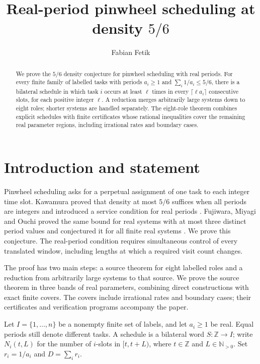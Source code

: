 \documentclass[11pt,a4paper]{article}
\title{Real-period pinwheel scheduling at density $5/6$}
\author{Fabian Fetik}
\date{}
\begin{document}
\maketitle
\begin{abstract}

We prove the \(5/6\) density conjecture for pinwheel scheduling with real periods. For every finite family of labelled tasks with periods \(a_i\ge1\) and \(\sum_i1/a_i\le5/6\), there is a bilateral schedule in which task \(i\) occurs at least \(\ell\) times in every \(\lceil\ell a_i\rceil\) consecutive slots, for each positive integer \(\ell\). A reduction merges arbitrarily large systems down to eight roles; shorter systems are handled separately. The eight-role theorem combines explicit schedules with finite certificates whose rational inequalities cover the remaining real parameter regions, including irrational rates and boundary cases.

\end{abstract}

\section{Introduction and statement}\label{sec:1}

Pinwheel scheduling asks for a perpetual assignment of one task to each integer time slot. Kawamura proved that density at most \(5/6\) suffices when all periods are integers and introduced a service condition for real periods \cite{kawamura}. Fujiwara, Miyagi and Ouchi proved the same bound for real systems with at most three distinct period values and conjectured it for all finite real systems \cite{fujiwara-miyagi-ouchi}. We prove this conjecture. The real-period condition requires simultaneous control of every translated window, including lengths at which a required visit count changes.

The proof has two main steps: a source theorem for eight labelled roles and a reduction from arbitrarily large systems to that source. We prove the source theorem in three bands of real parameters, combining direct constructions with exact finite covers. The covers include irrational rates and boundary cases; their certificates and verification programs accompany the paper.

Let \(I=\{1,\ldots,n\}\) be a nonempty finite set of labels, and let \(a_i\ge1\) be real. Equal periods still denote different tasks. A schedule is a bilateral word \(S:\mathbb Z\to I\); write \(N_i(t,L)\) for the number of \(i\)-slots in \([t,t+L)\), where \(t\in\mathbb Z\) and \(L\in\mathbb N_{>0}\). Set \(r_i=1/a_i\) and \(D=\sum_i r_i\).
\end{document}
